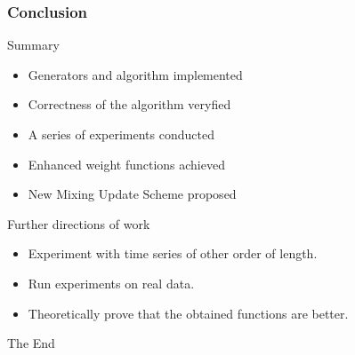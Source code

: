 \documentclass{beamer}
\begin{document}
\begin{frame}
\frametitle{Conclusion}

\begin{block}
    
    Summary
        
    \begin{itemize}
  
        \item Generators and algorithm implemented
        \item Correctness of the algorithm veryfied
        \item A series of experiments conducted
        \item Enhanced weight functions achieved
        \item New Mixing Update Scheme proposed

    \end{itemize}
    \end{block}    
    
    \begin{block}
    
    Further directions of work
    
    \begin{itemize}
    	\item Experiment with time series of other order of length.      
	\item Run experiments on real data.
        \item Theoretically prove that the obtained functions are better.             
    \end{itemize}
    \end{block}

    
\end{frame}


\begin{frame}
\Huge{\centerline{The End}}
\end{frame}
\end{document}
